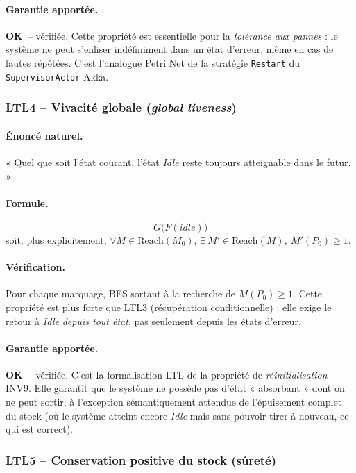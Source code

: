\documentclass[11pt,a4paper]{article}
\newcommand{\code}[1]{\texttt{#1}}
\newcommand{\OK}{\textcolor{green!50!black}{\textbf{OK}}}
\begin{document}
\paragraph{Garantie apportée.}
\OK\ -- vérifiée. Cette propriété est essentielle pour la \emph{tolérance
aux pannes} : le système ne peut s'enliser indéfiniment dans un état
d'erreur, même en cas de fautes répétées. C'est l'analogue Petri Net de la
stratégie \code{Restart} du \code{SupervisorActor} Akka.

\subsubsection*{LTL4 -- Vivacité globale (\emph{global liveness})}

\paragraph{Énoncé naturel.}
« Quel que soit l'état courant, l'état \textit{Idle} reste toujours
atteignable dans le futur. »

\paragraph{Formule.}
\[
G\bigl(F(\textit{idle})\bigr)
\]
soit, plus explicitement, $\forall M \in \mathrm{Reach}(M_0),\
\exists\, M' \in \mathrm{Reach}(M),\ M'(P_0) \geq 1$.

\paragraph{Vérification.}
Pour chaque marquage, BFS sortant à la recherche de $M(P_0) \geq 1$. Cette
propriété est plus forte que LTL3 (récupération conditionnelle) : elle
exige le retour à \textit{Idle} \emph{depuis tout état}, pas seulement
depuis les états d'erreur.

\paragraph{Garantie apportée.}
\OK\ -- vérifiée. C'est la formalisation LTL de la propriété de
\emph{réinitialisation} INV9. Elle garantit que le système ne possède pas
d'état « absorbant » dont on ne peut sortir, à l'exception sémantiquement
attendue de l'épuisement complet du stock (où le système atteint encore
\textit{Idle} mais sans pouvoir tirer à nouveau, ce qui est correct).

\subsubsection*{LTL5 -- Conservation positive du stock (sûreté)}
\end{document}
